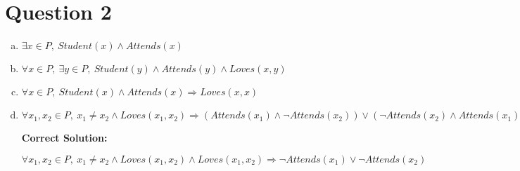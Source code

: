 \documentclass[12pt]{article}
\begin{document}
\section*{Question 2}
\begin{enumerate}[a.]
    \item

    $\exists x \in P,\: Student(x) \land Attends(x)$

    \item

    $\forall x \in P,\:\exists y \in P,\:Student(y) \land Attends(y) \land Loves(x,y)$

    \item

    $\forall x \in P,\: Student(x) \land Attends(x) \Rightarrow Loves(x,x)$

    \item

    $\forall x_1,x_2 \in P,\:x_1 \neq x_2 \land Loves(x_1,x_2) \Rightarrow
    (Attends(x_1) \land \neg Attends(x_2)) \lor (\neg Attends(x_2) \land Attends(x_1))$

    \bigskip

    \textbf{Correct Solution:}

    $\forall x_1,x_2 \in P,\:x_1 \neq x_2 \land Loves(x_1,x_2) \land Loves(x_1,x_2) \Rightarrow
    \neg Attends(x_1) \lor \neg Attends(x_2)$


\end{enumerate}
\end{document}
